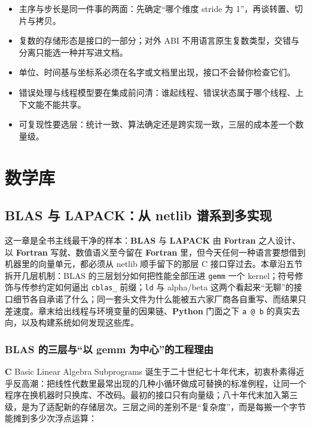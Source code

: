 \documentclass[12pt,a4paper,fontset=fandol]{ctexbook}
\newcommand{\Tp}[1]{\texttt{#1}}
\newcommand{\Bk}{\allowbreak}
\newcommand{\Lib}[1]{\textbf{#1}}
\newcommand{\Lang}[1]{\textsf{\bfseries #1}}
\newcommand{\CL}{\Lang{C}}
\newcommand{\FTN}{\Lang{Fortran}}
\newcommand{\PY}{\Lang{Python}}
\begin{document}
\begin{guideline}[title={共同约定五条}]
\begin{itemize}
\item 主序与步长是同一件事的两面：先确定``哪个维度 stride 为 1''，再谈转置、切片与拷贝。
\item 复数的存储形态是接口的一部分；对外 ABI 不用语言原生复数类型，交错与分离只能选一种并写进文档。
\item 单位、时间基与坐标系必须在名字或文档里出现，接口不会替你检查它们。
\item 错误处理与线程模型要在集成前问清：谁起线程、错误状态属于哪个线程、上下文能不能共享。
\item 可复现性要选层：统计一致、算法确定还是跨实现一致，三层的成本差一个数量级。
\end{itemize}
\end{guideline}

\part{数学库}

\chapter{BLAS 与 LAPACK：从 netlib 谱系到多实现}

这一章是全书主线最干净的样本：\Lib{BLAS} 与 \Lib{LAPACK} 由 \FTN{} 之人设计、以 \FTN{} 写就、数值语义至今留在 \FTN{} 里，但今天任何一种语言要想借到机器里的向量单元，都必须从 netlib 顺手留下的那层 C 接口穿过去。本章沿五节拆开几层机制：BLAS 的三层划分如何把性能全部压进 \Tp{gemm} 一个 kernel；符号修饰与传参约定如何逼出 \Tp{cblas\_} \Bk{} 前缀；\Tp{ld} 与 alpha/beta 这两个看起来``无聊''的接口细节各自承诺了什么；同一套头文件为什么能被五六家厂商各自重写、而结果只差速度。章末给出线程与环境变量的因果链、\PY{} 门面之下 \Tp{a @ b} \Bk{} 的真实去向，以及构建系统如何发现这些库。

\section{BLAS 的三层与``以 gemm 为中心''的工程理由}

\CL{} Basic Linear Algebra Subprograms 诞生于二十世纪七十年代末，初衷朴素得近乎反高潮：把线性代数里最常出现的几种小循环做成可替换的标准例程，让同一个程序在换机器时只换库、不改码。最初的接口只有向量级；八十年代末加入第三级，是为了适配新的存储层次。三层之间的差别不是``复杂度''，而是每搬一个字节能摊到多少次浮点运算：
\end{document}
